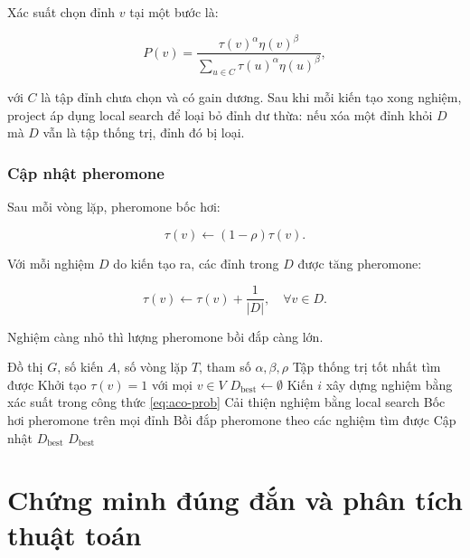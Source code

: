 \documentclass[12pt, a4paper]{report}
\newcommand{\MDS}{\textsc{Minimum Dominating Set}}
\begin{document}
Xác suất chọn đỉnh $v$ tại một bước là:

\begin{equation}
  P(v)=
  \frac{\tau(v)^\alpha \eta(v)^\beta}
  {\sum_{u \in C}\tau(u)^\alpha \eta(u)^\beta},
  \label{eq:aco-prob}
\end{equation}

với $C$ là tập đỉnh chưa chọn và có gain dương. Sau khi mỗi kiến tạo xong nghiệm, project áp dụng local
search để loại bỏ đỉnh dư thừa: nếu xóa một đỉnh khỏi $D$ mà $D$ vẫn là tập thống trị, đỉnh đó bị loại.

\subsection{Cập nhật pheromone}

Sau mỗi vòng lặp, pheromone bốc hơi:

\begin{equation}
  \tau(v) \gets (1-\rho)\tau(v).
\end{equation}

Với mỗi nghiệm $D$ do kiến tạo ra, các đỉnh trong $D$ được tăng pheromone:

\begin{equation}
  \tau(v) \gets \tau(v) + \frac{1}{|D|},\quad \forall v\in D.
\end{equation}

Nghiệm càng nhỏ thì lượng pheromone bồi đắp càng lớn.

\begin{algorithm}[H]
\caption{ACO cho bài toán \MDS{}}
\begin{algorithmic}[1]
\Require Đồ thị $G$, số kiến $A$, số vòng lặp $T$, tham số $\alpha,\beta,\rho$
\Ensure Tập thống trị tốt nhất tìm được
\State Khởi tạo $\tau(v)=1$ với mọi $v\in V$
\State $D_{\mathrm{best}}\gets \emptyset$
    \State Kiến $i$ xây dựng nghiệm bằng xác suất trong công thức \ref{eq:aco-prob}
    \State Cải thiện nghiệm bằng local search
  \EndFor
  \State Bốc hơi pheromone trên mọi đỉnh
  \State Bồi đắp pheromone theo các nghiệm tìm được
  \State Cập nhật $D_{\mathrm{best}}$
\EndFor
\State \Return $D_{\mathrm{best}}$
\end{algorithmic}
\end{algorithm}

\chapter{Chứng minh đúng đắn và phân tích thuật toán}
\end{document}
